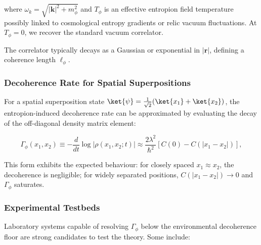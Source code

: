 \documentclass[12pt]{article}
\begin{document}
where $\omega_k = \sqrt{|\mathbf{k}|^2 + m_\phi^2}$ and $T_\phi$ is an effective entropion field temperature possibly linked to cosmological entropy gradients or relic vacuum fluctuations. At $T_\phi = 0$, we recover the standard vacuum correlator.

The correlator typically decays as a Gaussian or exponential in $|\mathbf{r}|$, defining a coherence length $\ell_\phi$.

\subsubsection*{Decoherence Rate for Spatial Superpositions}

For a spatial superposition state $\ket{\psi} = \frac{1}{\sqrt{2}} ( \ket{x_1} + \ket{x_2} )$, the entropion-induced decoherence rate can be approximated by evaluating the decay of the off-diagonal density matrix element:

\begin{equation}
\Gamma_\phi(x_1, x_2) \equiv -\frac{d}{dt} \log \left| \rho(x_1, x_2; t) \right| \approx \frac{2\lambda^2}{\hbar^2} \left[ C(0) - C(|x_1 - x_2|) \right],
\label{eq:entropion_decoherence_rate}
\end{equation}

This form exhibits the expected behaviour: for closely spaced $x_1 \approx x_2$, the decoherence is negligible; for widely separated positions, $C(|x_1 - x_2|) \to 0$ and $\Gamma_\phi$ saturates.

\subsubsection*{Experimental Testbeds}

Laboratory systems capable of resolving $\Gamma_\phi$ below the environmental decoherence floor are strong candidates to test the theory. Some include:
\end{document}

